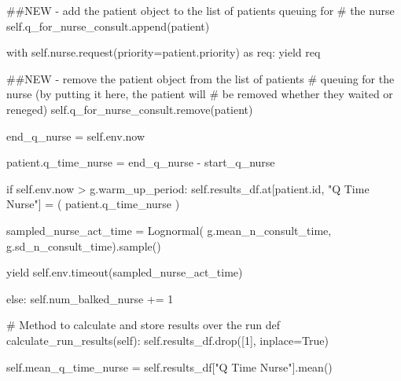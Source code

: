 \documentclass[
  letterpaper,
  DIV=11,
  numbers=noendperiod]{scrreprt}
\newenvironment{Shaded}{}{}
\newcommand{\BuiltInTok}[1]{\textcolor[rgb]{0.84,0.23,0.29}{#1}}
\newcommand{\CommentTok}[1]{\textcolor[rgb]{0.42,0.45,0.49}{#1}}
\newcommand{\ControlFlowTok}[1]{\textcolor[rgb]{0.84,0.23,0.29}{#1}}
\newcommand{\DecValTok}[1]{\textcolor[rgb]{0.00,0.36,0.77}{#1}}
\newcommand{\ImportTok}[1]{\textcolor[rgb]{0.01,0.18,0.38}{#1}}
\newcommand{\KeywordTok}[1]{\textcolor[rgb]{0.84,0.23,0.29}{#1}}
\newcommand{\NormalTok}[1]{\textcolor[rgb]{0.14,0.16,0.18}{#1}}
\newcommand{\OperatorTok}[1]{\textcolor[rgb]{0.14,0.16,0.18}{#1}}
\newcommand{\StringTok}[1]{\textcolor[rgb]{0.01,0.18,0.38}{#1}}
\newcommand{\VariableTok}[1]{\textcolor[rgb]{0.89,0.38,0.04}{#1}}
\begin{document}
\begin{tcolorbox}
\begin{Shaded}
\begin{Highlighting}[]
            \CommentTok{\#\#NEW {-} add the patient object to the list of patients queuing for}
            \CommentTok{\# the nurse}
            \VariableTok{self}\NormalTok{.q\_for\_nurse\_consult.append(patient)}

            \ControlFlowTok{with} \VariableTok{self}\NormalTok{.nurse.request(priority}\OperatorTok{=}\NormalTok{patient.priority) }\ImportTok{as}\NormalTok{ req:}
                \ControlFlowTok{yield}\NormalTok{ req}

                \CommentTok{\#\#NEW {-} remove the patient object from the list of patients}
                \CommentTok{\# queuing for the nurse (by putting it here, the patient will}
                \CommentTok{\# be removed whether they waited or reneged)}
                \VariableTok{self}\NormalTok{.q\_for\_nurse\_consult.remove(patient)}

\NormalTok{                end\_q\_nurse }\OperatorTok{=} \VariableTok{self}\NormalTok{.env.now}

\NormalTok{                patient.q\_time\_nurse }\OperatorTok{=}\NormalTok{ end\_q\_nurse }\OperatorTok{{-}}\NormalTok{ start\_q\_nurse}

                \ControlFlowTok{if} \VariableTok{self}\NormalTok{.env.now }\OperatorTok{\textgreater{}}\NormalTok{ g.warm\_up\_period:}
                    \VariableTok{self}\NormalTok{.results\_df.at[patient.}\BuiltInTok{id}\NormalTok{, }\StringTok{"Q Time Nurse"}\NormalTok{] }\OperatorTok{=}\NormalTok{ (}
\NormalTok{                        patient.q\_time\_nurse}
\NormalTok{                    )}

\NormalTok{                sampled\_nurse\_act\_time }\OperatorTok{=}\NormalTok{ Lognormal(}
\NormalTok{                    g.mean\_n\_consult\_time, g.sd\_n\_consult\_time).sample()}

                \ControlFlowTok{yield} \VariableTok{self}\NormalTok{.env.timeout(sampled\_nurse\_act\_time)}

        \ControlFlowTok{else}\NormalTok{:}
            \VariableTok{self}\NormalTok{.num\_balked\_nurse }\OperatorTok{+=} \DecValTok{1}

    \CommentTok{\# Method to calculate and store results over the run}
    \KeywordTok{def}\NormalTok{ calculate\_run\_results(}\VariableTok{self}\NormalTok{):}
        \VariableTok{self}\NormalTok{.results\_df.drop([}\DecValTok{1}\NormalTok{], inplace}\OperatorTok{=}\VariableTok{True}\NormalTok{)}

        \VariableTok{self}\NormalTok{.mean\_q\_time\_nurse }\OperatorTok{=} \VariableTok{self}\NormalTok{.results\_df[}\StringTok{"Q Time Nurse"}\NormalTok{].mean()}


\end{Highlighting}
\end{Shaded}
\end{tcolorbox}
\end{document}
